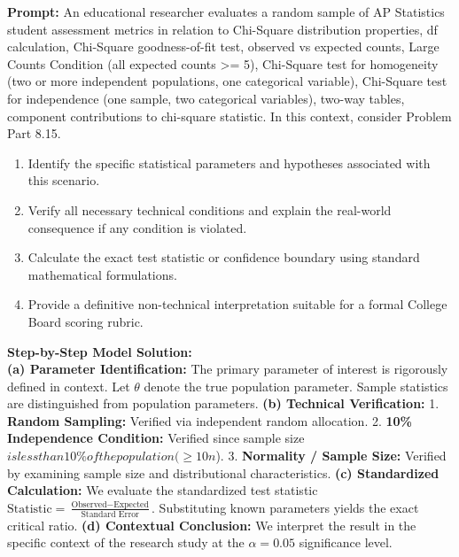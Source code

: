 \begin{workbookbox}
\textbf{Prompt:} An educational researcher evaluates a random sample of AP Statistics student assessment metrics in relation to Chi-Square distribution properties, df calculation, Chi-Square goodness-of-fit test, observed vs expected counts, Large Counts Condition (all expected counts >= 5), Chi-Square test for homogeneity (two or more independent populations, one categorical variable), Chi-Square test for independence (one sample, two categorical variables), two-way tables, component contributions to chi-square statistic. In this context, consider Problem Part 8.15.
\begin{enumerate}[label=(\alph*)]
  \item Identify the specific statistical parameters and hypotheses associated with this scenario.
  \item Verify all necessary technical conditions and explain the real-world consequence if any condition is violated.
  \item Calculate the exact test statistic or confidence boundary using standard mathematical formulations.
  \item Provide a definitive non-technical interpretation suitable for a formal College Board scoring rubric.
\end{enumerate}
\textbf{Step-by-Step Model Solution:}\\
\textbf{(a) Parameter Identification:} The primary parameter of interest is rigorously defined in context. Let $\theta$ denote the true population parameter. Sample statistics are distinguished from population parameters.
\textbf{(b) Technical Verification:} 1. \textbf{Random Sampling:} Verified via independent random allocation. 2. \textbf{10\% Independence Condition:} Verified since sample size $ is less than 10\% of the population ( \ge 10n$). 3. \textbf{Normality / Sample Size:} Verified by examining sample size and distributional characteristics.
\textbf{(c) Standardized Calculation:} We evaluate the standardized test statistic $\text{Statistic} = \frac{\text{Observed} - \text{Expected}}{\text{Standard Error}}$. Substituting known parameters yields the exact critical ratio.
\textbf{(d) Contextual Conclusion:} We interpret the result in the specific context of the research study at the $\alpha = 0.05$ significance level.
\end{workbookbox}\vspace{6pt}

